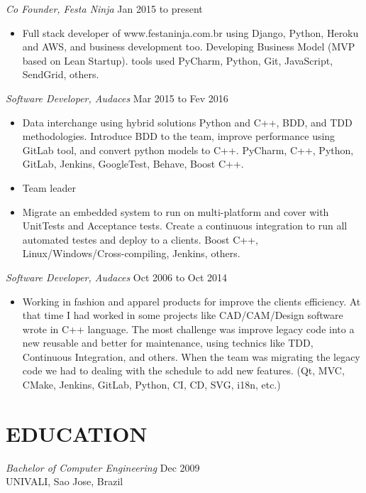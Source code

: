 \documentclass[line,margin]{res}
\begin{document}
\begin{resume}
                {\sl Co Founder, Festa Ninja} \hfill Jan 2015 to present \\
                 \begin{itemize}  \itemsep -2pt
                 \item Full stack developer of www.festaninja.com.br using Django, Python, Heroku and AWS, and business development too. Developing Business Model (MVP based on Lean Startup). tools used PyCharm, Python, Git, JavaScript, SendGrid, others.
                 \end{itemize}
                {\sl Software Developer, Audaces} \hfill Mar 2015 to Fev 2016 \\
                  \begin{itemize}
                   \item Data interchange using hybrid solutions Python and C++, BDD, and TDD methodologies. Introduce BDD to the team, improve performance using GitLab tool, and convert python models to C++. PyCharm, C++, Python, GitLab, Jenkins, GoogleTest, Behave, Boost C++.
                   \item Team leader
                   \item Migrate an embedded system to run on multi-platform and cover with UnitTests and Acceptance tests. Create a continuous integration to run all automated testes and deploy to a clients. Boost C++, Linux/Windows/Cross-compiling, Jenkins, others.
                   \end{itemize}
   {\sl Software Developer, Audaces} \hfill Oct 2006 to Oct 2014 \\
                  \begin{itemize}
                   \item Working in fashion and apparel products for improve the clients efficiency. At that time I had worked in some projects like CAD/CAM/Design software wrote in C++ language. The most challenge was improve legacy code into a new reusable and better for maintenance, using technics like TDD, Continuous Integration, and others. When the team was migrating the legacy code we had to dealing with the schedule to add new features. (Qt, MVC, CMake, Jenkins, GitLab, Python, CI, CD, SVG, i18n, etc.)
                   \end{itemize}
\section{EDUCATION} {\sl Bachelor of Computer Engineering} \hfill Dec 2009\\
                UNIVALI, Sao Jose, Brazil



\end{resume}
\end{document}
